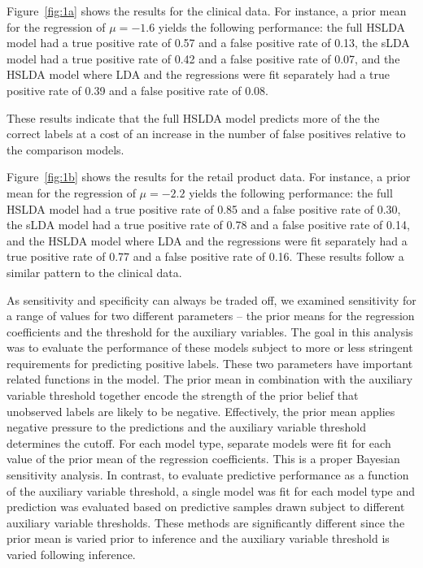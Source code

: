 Figure~\ref{fig:1a} shows the results for the clinical data. For instance, 
a prior mean for the regression of $\mu=-1.6$ yields the following performance:
the full HSLDA model had a 
true positive rate of 0.57 and a false positive rate of 0.13, the sLDA model
had a true positive rate of 0.42 and a false positive rate of 0.07, and the
HSLDA model where LDA and the regressions were fit separately had a true
positive rate of 0.39 and a false positive rate of 0.08.

These results indicate that the full HSLDA model predicts more of the the
correct labels at a cost of an increase in the number of false positives
relative to the comparison models.

Figure~\ref{fig:1b} shows the results for the retail product data. For
instance, a prior mean for the regression of $\mu=-2.2$ yields the following
performance: the full HSLDA model had a true positive rate of 0.85 
and a false positive rate of 0.30, the sLDA model had a true positive
rate of 0.78 and a false positive rate of 0.14, and the HSLDA model where
LDA and the regressions were fit separately had a true positive rate of 0.77
and a false positive rate of 0.16. These results follow a similar pattern to the clinical data.

As sensitivity and specificity can always be traded off, we examined
sensitivity for a range of values for two different parameters -- the prior
means for the regression coefficients and the threshold for the auxiliary
variables.  The goal in this analysis was to evaluate the performance of these
models subject to more or less stringent requirements for predicting positive
labels. These two parameters have important related functions in the model. The
prior mean in combination with the auxiliary variable threshold together encode
the strength of the prior belief that unobserved labels are likely to be
negative. Effectively, the prior mean applies negative pressure to the
predictions and the auxiliary variable threshold determines the cutoff. 
For each model type, separate models were fit for each value of the 
prior mean of the regression coefficients.  This is a proper Bayesian
sensitivity analysis. In contrast, to evaluate
predictive performance as a function of the auxiliary variable threshold,
a single model was fit for each model type and prediction was evaluated
based on predictive samples drawn subject to different auxiliary variable
thresholds. These methods are significantly different since the prior mean
is varied prior to inference and the auxiliary variable threshold is varied
following inference.

